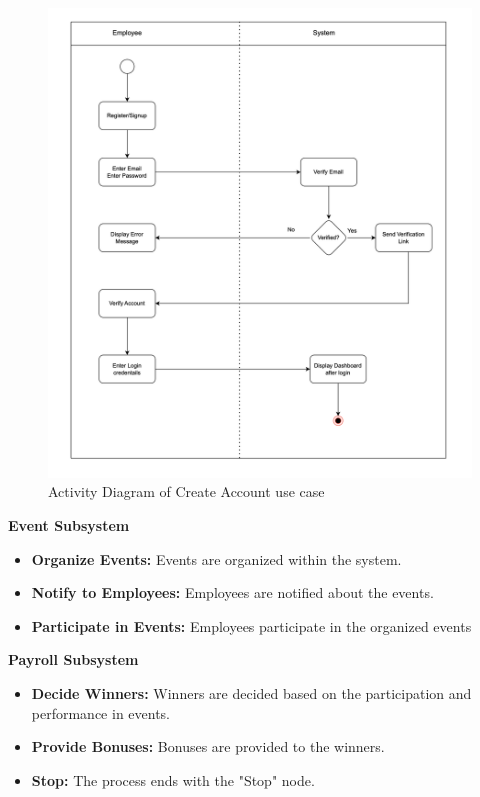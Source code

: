 \begin{figure}[h!t]
    \centering
    \includegraphics[width=\textwidth]{images/activityCreateAccount.png}
    \caption{Activity Diagram of Create Account use case}
    \label{fig:activityCreateAccount}
\end{figure}

\FloatBarrier

\textbf{Event Subsystem }
\begin{itemize}
    \item \textbf{Organize Events: }Events are organized within the system.
    \item \textbf{Notify to Employees: }Employees are notified about the events. 
    \item \textbf{Participate in Events: }Employees participate in the organized events
\end{itemize}
\leavevmode
\newline
\textbf{Payroll Subsystem }
\begin{itemize}
    \item \textbf{Decide Winners: }Winners are decided based on the participation and performance in events. 
    \item \textbf{Provide Bonuses: }Bonuses are provided to the winners. 
    \item \textbf{Stop: }The process ends with the "Stop" node. 
\end{itemize}

